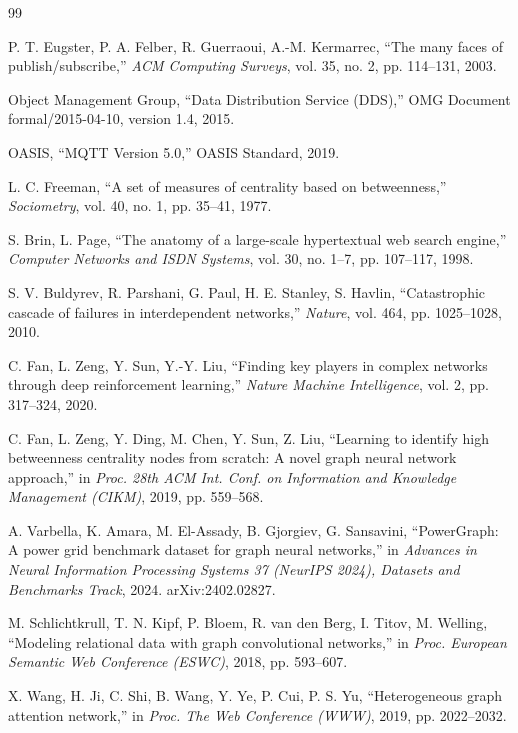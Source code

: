 \documentclass[review]{elsarticle}
\begin{document}
\begin{thebibliography}{99}

 P. T. Eugster, P. A. Felber, R. Guerraoui, A.-M. Kermarrec, ``The many faces
of publish/subscribe,'' \emph{ACM Computing Surveys}, vol. 35, no. 2, pp. 114--131, 2003.

 Object Management Group, ``Data Distribution Service (DDS),'' OMG Document
formal/2015-04-10, version 1.4, 2015.

 OASIS, ``MQTT Version 5.0,'' OASIS Standard, 2019.

 L. C. Freeman, ``A set of measures of centrality based on betweenness,''
\emph{Sociometry}, vol. 40, no. 1, pp. 35--41, 1977.

 S. Brin, L. Page, ``The anatomy of a large-scale hypertextual web search
engine,'' \emph{Computer Networks and ISDN Systems}, vol. 30, no. 1--7, pp. 107--117, 1998.

 S. V. Buldyrev, R. Parshani, G. Paul, H. E. Stanley, S. Havlin,
``Catastrophic cascade of failures in interdependent networks,'' \emph{Nature}, vol. 464, pp.
1025--1028, 2010.

 C. Fan, L. Zeng, Y. Sun, Y.-Y. Liu, ``Finding key players in complex
networks through deep reinforcement learning,'' \emph{Nature Machine Intelligence}, vol. 2, pp.
317--324, 2020.

 C. Fan, L. Zeng, Y. Ding, M. Chen, Y. Sun, Z. Liu, ``Learning to identify high
betweenness centrality nodes from scratch: A novel graph neural network approach,'' in \emph{Proc.
28th ACM Int. Conf. on Information and Knowledge Management (CIKM)}, 2019, pp. 559--568.

 A. Varbella, K. Amara, M. El-Assady, B. Gjorgiev, G. Sansavini,
``PowerGraph: A power grid benchmark dataset for graph neural networks,'' in \emph{Advances in
Neural Information Processing Systems 37 (NeurIPS 2024), Datasets and Benchmarks Track}, 2024.
arXiv:2402.02827.

 M. Schlichtkrull, T. N. Kipf, P. Bloem, R. van den Berg, I. Titov, M.
Welling, ``Modeling relational data with graph convolutional networks,'' in \emph{Proc. European
Semantic Web Conference (ESWC)}, 2018, pp. 593--607.

 X. Wang, H. Ji, C. Shi, B. Wang, Y. Ye, P. Cui, P. S. Yu, ``Heterogeneous
graph attention network,'' in \emph{Proc. The Web Conference (WWW)}, 2019, pp. 2022--2032.


\end{thebibliography}
\end{document}
